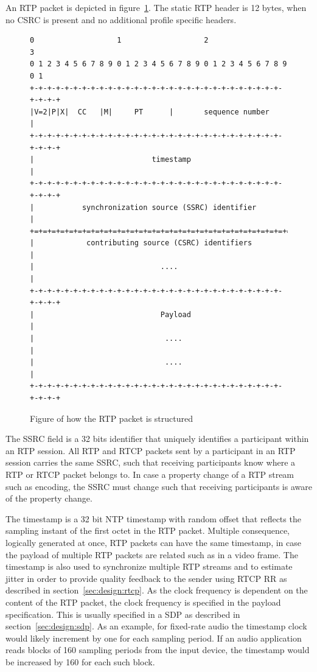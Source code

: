 An RTP packet is depicted in figure~\ref{fig:design:rtppacket}. The static RTP header is 12 bytes, when no CSRC is present and no additional profile specific headers.

\begin{figure}[H]
\centering
\begin{verbatim}
0                   1                   2                   3
0 1 2 3 4 5 6 7 8 9 0 1 2 3 4 5 6 7 8 9 0 1 2 3 4 5 6 7 8 9 0 1
+-+-+-+-+-+-+-+-+-+-+-+-+-+-+-+-+-+-+-+-+-+-+-+-+-+-+-+-+-+-+-+-+
|V=2|P|X|  CC   |M|     PT      |       sequence number         |
+-+-+-+-+-+-+-+-+-+-+-+-+-+-+-+-+-+-+-+-+-+-+-+-+-+-+-+-+-+-+-+-+
|                           timestamp                           |
+-+-+-+-+-+-+-+-+-+-+-+-+-+-+-+-+-+-+-+-+-+-+-+-+-+-+-+-+-+-+-+-+
|           synchronization source (SSRC) identifier            |
+=+=+=+=+=+=+=+=+=+=+=+=+=+=+=+=+=+=+=+=+=+=+=+=+=+=+=+=+=+=+=+=+
|            contributing source (CSRC) identifiers             |
|                             ....                              |
+-+-+-+-+-+-+-+-+-+-+-+-+-+-+-+-+-+-+-+-+-+-+-+-+-+-+-+-+-+-+-+-+
|                             Payload                           |
|                              ....                             |
|                              ....                             |
+-+-+-+-+-+-+-+-+-+-+-+-+-+-+-+-+-+-+-+-+-+-+-+-+-+-+-+-+-+-+-+-+
\end{verbatim}
\caption{Figure of how the RTP packet is structured\citep{RFC3550}}
\label{fig:design:rtppacket}
\end{figure}


The \ac{SSRC} field is a 32 bits identifier that uniquely identifies a participant within an RTP session. All RTP and RTCP packets sent by a participant in an RTP session carries the same SSRC, such that receiving participants know where a RTP or RTCP packet belongs to. In case a property change of a RTP stream such as encoding, the SSRC must change such that receiving participants is aware of the property change.

The timestamp is a 32 bit NTP timestamp with random offset that reflects the sampling instant of the first octet in the RTP packet. Multiple consequence, logically generated at once, RTP packets can have the same timestamp, in case the payload of multiple RTP packets are related such as in a video frame.
The timestamp is also used to synchronize multiple RTP streams and to estimate jitter in order to provide quality feedback to the sender using RTCP RR as described in section~\ref{sec:design:rtcp}.
As the clock frequency is dependent on the content of the RTP packet, the clock frequency is specified in the payload specification. This is usually specified in a SDP as described in section~\ref{sec:design:sdp}. As an example, for fixed-rate audio the timestamp clock would likely increment by one for each sampling period. If an audio application reads blocks of 160 sampling periods from the input device, the timestamp would be increased by 160 for each such block\citep{RFC3550}.

